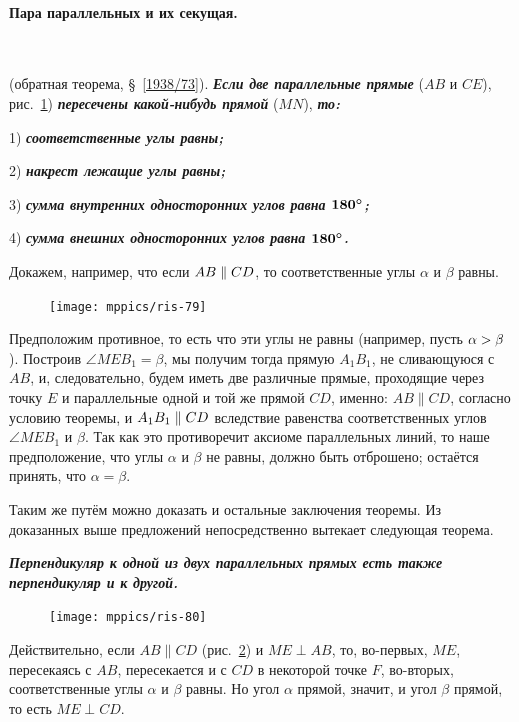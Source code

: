 \paragraph{Пара параллельных и их секущая.}\label{1938/77}\ 

\smallskip
{} (обратная теорема, §~\ref{1938/73}).
\textbf{\emph{Если две параллельные прямые}} ($AB$ и $CE$), рис.~\ref{1938/ris-79}) \textbf{\emph{пересечены какой-нибудь прямой}} ($MN$), \textbf{\emph{то:}}

1) \textbf{\emph{соответственные углы равны;}}

2) \textbf{\emph{накрест лежащие углы равны;}}

3) \textbf{\emph{сумма внутренних односторонних углов равна $\bm{180\degree}$;}}

4) \textbf{\emph{сумма внешних односторонних углов равна $\bm{180\degree}$.}}

Докажем, например, что если $AB\z\parallel CD$, то соответственные углы $\alpha$ и $\beta$ равны.

\begin{figure}
\centering
\texttt{[image: mppics/ris-79]}
\caption{}\label{1938/ris-79}
\end{figure}

Предположим противное, то есть что эти углы не равны (например, пусть $\alpha \z> \beta$).
Построив $\angle MEB_1 = \beta$, мы получим тогда прямую $A_1B_1$, не сливающуюся с $AB$, и, следовательно, будем иметь две различные прямые, проходящие через точку $E$ и параллельные одной и той же прямой $CD$, именно:
$AB\parallel CD$, согласно условию теоремы, и $A_1B_1\z\parallel CD$ вследствие равенства соответственных углов $\angle MEB_1$ и $ \beta$.
Так как это противоречит аксиоме параллельных линий, то наше предположение, что углы $\alpha$ и $\beta$ не равны, должно быть отброшено;
остаётся принять, что $ \alpha =  \beta$.

Таким же путём можно доказать и остальные заключения теоремы.
Из доказанных выше предложений непосредственно вытекает следующая теорема.

\textbf{\emph{Перпендикуляр к одной из двух параллельных прямых есть также перпендикуляр и к другой.}}

\begin{figure}
\centering
\texttt{[image: mppics/ris-80]}
\caption{}\label{1938/ris-80}
\end{figure}

Действительно, если $AB\parallel CD$ (рис.~\ref{1938/ris-80}) и $ME\perp AB$, то, во-первых, $ME$, пересекаясь с $AB$, пересекается и с $CD$ в некоторой точке $F$, во-вторых, соответственные углы $\alpha$ и $\beta$ равны.
Но угол $\alpha$ прямой, значит, и угол $\beta$ прямой, то есть
$ME\perp CD$.

